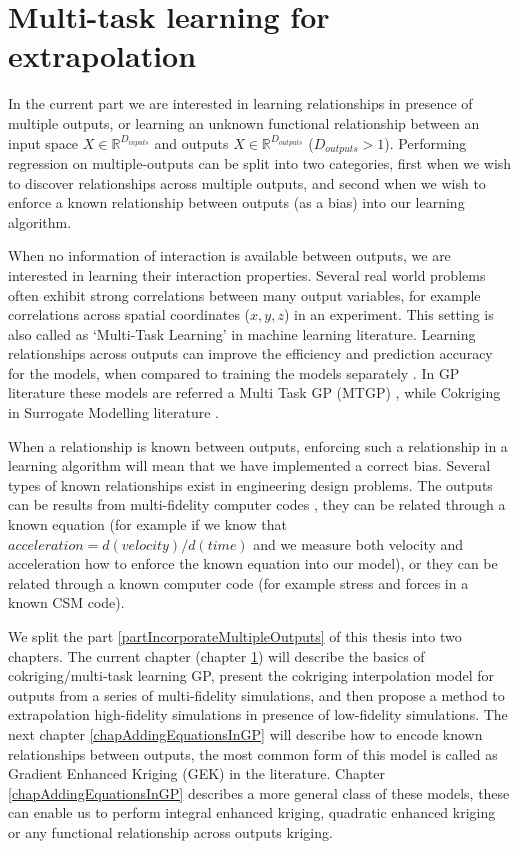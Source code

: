 \chapter{Multi-task learning for extrapolation}
\label{chapMultiTaskExtrapolation}
In the current part we are interested in learning relationships in presence of multiple outputs, or learning an unknown functional relationship between an input space $X \in \mathbb{R}^{D_{inputs}}$ and outputs  $X \in \mathbb{R}^{D_{outputs}}$ ($D_{outputs}>1$). Performing regression on multiple-outputs can be split into two categories, first when we wish to discover relationships across multiple outputs, and second when we wish to enforce a known relationship between outputs (as a bias) into our learning algorithm.

When no information of interaction is available between outputs, we are interested in learning their interaction properties. Several real world problems often exhibit strong correlations between many output variables, for example correlations across spatial coordinates ($x, y, z$) in an experiment. This setting is also called as `Multi-Task Learning' in machine learning literature. Learning relationships across outputs can improve the efficiency and prediction accuracy for the models, when compared to training the models separately \cite{caruana1998multitask}. In GP literature these models are referred a Multi Task GP (MTGP) \cite{alvarez2011kernels, bonilla_multi-task_2008, Boyle05dependentgaussian}, while Cokriging in Surrogate Modelling literature \cite{helterbrand1994universal, chilès1999geostatistics, ver1998constructing}.

When a relationship is known between outputs, enforcing such a relationship in a learning algorithm will mean that we have implemented a correct bias. Several types of known relationships exist in engineering design problems. The outputs can be results from multi-fidelity computer codes \cite{kennedy2000predicting, forrester2007multi, le2013multi}, they can be related through a known equation \cite{ginsbourger2013invariances, sarkka2011linear} (for example if we know that $acceleration = d(velocity)/d(time)$ and we measure both velocity and acceleration how to enforce the known equation into our model), or they can be related through a known computer code \cite{Constantinescu2013}(for example stress and forces in a known CSM code). 

We split the part \ref{partIncorporateMultipleOutputs} of this thesis into two chapters. The current chapter (chapter \ref{chapMultiTaskExtrapolation}) will describe the basics of cokriging/multi-task learning GP, present the cokriging interpolation model for outputs from a series of multi-fidelity simulations, and then propose a method to extrapolation high-fidelity simulations in presence of low-fidelity simulations. The next chapter \ref{chapAddingEquationsInGP} will describe how to encode known relationships between outputs, the most common form of this model is called as Gradient Enhanced Kriging (GEK) in the literature. Chapter \ref{chapAddingEquationsInGP} describes a more general class of these models, these can enable us to perform integral enhanced kriging, quadratic enhanced kriging or any functional relationship across outputs kriging. 

